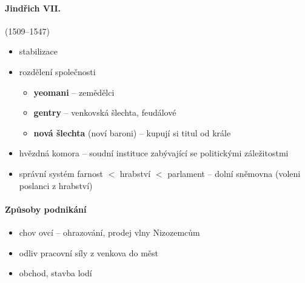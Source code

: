 \paragraph{Jindřich VII.} (1509--1547)
\begin{itemize}
\item stabilizace
\item rozdělení společnosti
	\begin{itemize}
	\item \textbf{yeomani} -- zemědělci
	\item \textbf{gentry} -- venkovská šlechta, feudálové
	\item \textbf{nová šlechta} (noví baroni) -- kupují si titul od krále
	\end{itemize}
\item hvězdná komora -- soudní instituce zabývající se politickými záležitostmi
\item správní systém farnost $<$ hrabství $<$ parlament -- dolní sněmovna (voleni poslanci z hrabství)
\end{itemize}

\paragraph{Způsoby podnikání}
\begin{itemize}
\item chov ovcí -- ohrazování, prodej vlny Nizozemcům
\item[\ra] odliv pracovní síly z venkova do měst
\item obchod, stavba lodí
\end{itemize}

